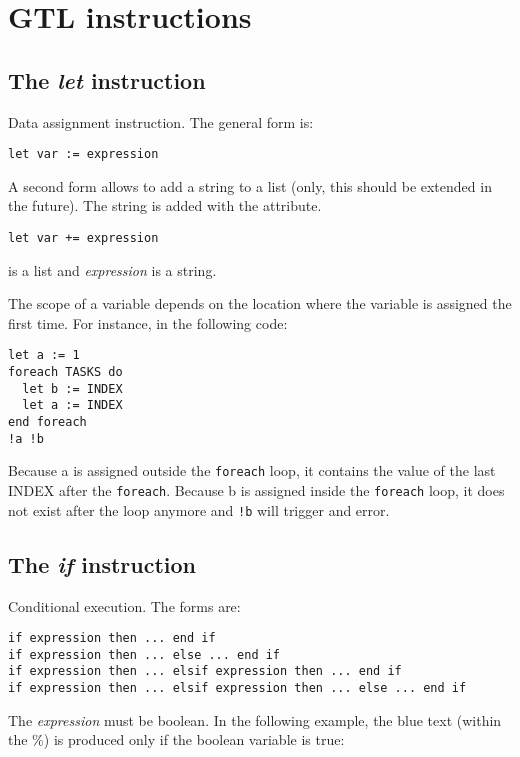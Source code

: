 \section{GTL instructions}

\subsection{The {\em let} instruction}

Data assignment instruction. The general form is:

\begin{lstlisting}
let var := expression
\end{lstlisting}

A second form allows to add a string to a list (only, this should be extended in the future). The string is added with the  attribute.

\begin{lstlisting}
let var += expression
\end{lstlisting}

 is a list and {\em expression} is a string.

The scope of a variable depends on the location where the variable is assigned the first time. For instance, in the following code:

\begin{lstlisting}
let a := 1
foreach TASKS do
  let b := INDEX
  let a := INDEX
end foreach
!a !b
\end{lstlisting}

Because a is assigned outside the {\tt foreach} loop, it contains the value of the last INDEX after the {\tt foreach}. Because b is assigned inside the {\tt foreach} loop, it does not exist after the loop anymore and {\tt!b} will trigger and error.


\subsection{The {\em if} instruction}

Conditional execution. The forms are:

\begin{lstlisting}
if expression then ... end if
if expression then ... else ... end if
if expression then ... elsif expression then ... end if
if expression then ... elsif expression then ... else ... end if
\end{lstlisting}    

The {\em expression} must be boolean. In the following example, the blue text (within the \%) is produced only if the  boolean variable is true:

